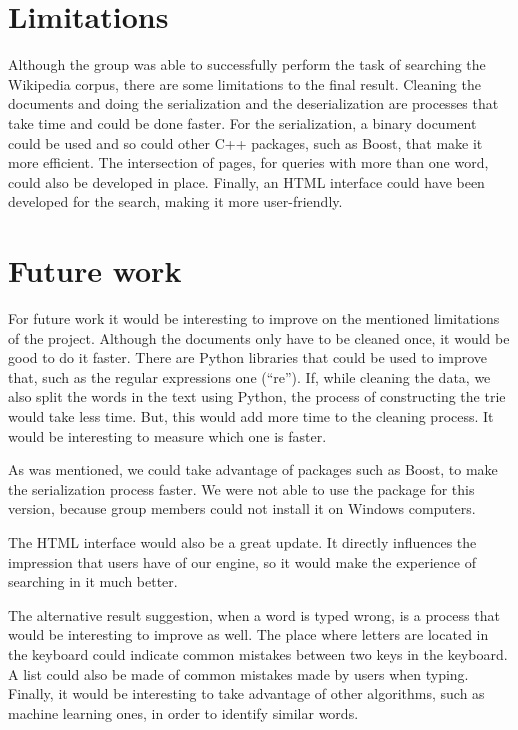 \documentclass{article}
\begin{document}
\section*{Limitations}
Although the group was able to successfully perform the task of searching the Wikipedia corpus, there are some limitations to the final result. Cleaning the documents and doing the serialization and the deserialization are processes that take time and could be done faster. For the serialization, a binary document could be used and so could other C++ packages, such as Boost, that make it more efficient. The intersection of pages, for queries with more than one word, could also be developed in place. Finally, an HTML interface could have been developed for the search, making it more user-friendly.

\section*{Future work}
For future work it would be interesting to improve on the mentioned limitations of the project. Although the documents only have to be cleaned once, it would be good to do it faster. There are Python libraries that could be used to improve that, such as the regular expressions one (``re''). If, while cleaning the data, we also split the words in the text using Python, the process of constructing the trie would take less time. But, this would add more time to the cleaning process. It would be interesting to measure which one is faster.

As was mentioned, we could take advantage of packages such as Boost, to make the serialization process faster. We were not able to use the package for this version, because group members could not install it on Windows computers. 

The HTML interface would also be a great update. It directly influences the impression that users have of our engine, so it would make the experience of searching in it much better. 

The alternative result suggestion, when a word is typed wrong, is a process that would be interesting to improve as well. The place where letters are located in the keyboard could indicate common mistakes between two keys in the keyboard. A list could also be made of common mistakes made by users when typing. Finally, it would be interesting to take advantage of other algorithms, such as machine learning ones, in order to identify similar words. 
\end{document}
